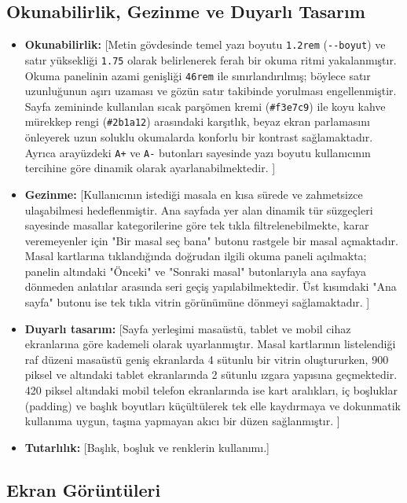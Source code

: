 \documentclass[12pt,a4paper]{article}
\begin{document}
\subsection{Okunabilirlik, Gezinme ve Duyarlı Tasarım}
\begin{itemize}
  \item \textbf{Okunabilirlik:} [Metin gövdesinde temel yazı boyutu \verb|1.2rem| (\verb|--boyut|) ve satır yüksekliği \verb|1.75| olarak belirlenerek ferah bir okuma ritmi yakalanmıştır. Okuma panelinin azami genişliği \verb|46rem| ile sınırlandırılmış; böylece satır uzunluğunun aşırı uzaması ve gözün satır takibinde yorulması engellenmiştir. Sayfa zemininde kullanılan sıcak parşömen kremi (\verb|#f3e7c9|) ile koyu kahve mürekkep rengi (\verb|#2b1a12|) arasındaki karşıtlık, beyaz ekran parlamasını önleyerek uzun soluklu okumalarda konforlu bir kontrast sağlamaktadır. Ayrıca arayüzdeki \verb|A+| ve \verb|A-| butonları sayesinde yazı boyutu kullanıcının tercihine göre dinamik olarak ayarlanabilmektedir.  ]
  \item \textbf{Gezinme:} [Kullanıcının istediği masala en kısa sürede ve zahmetsizce ulaşabilmesi hedeflenmiştir. Ana sayfada yer alan dinamik tür süzgeçleri sayesinde masallar kategorilerine göre tek tıkla filtrelenebilmekte, karar veremeyenler için "Bir masal seç bana" butonu rastgele bir masal açmaktadır. Masal kartlarına tıklandığında doğrudan ilgili okuma paneli açılmakta; panelin altındaki "Önceki" ve "Sonraki masal" butonlarıyla ana sayfaya dönmeden anlatılar arasında seri geçiş yapılabilmektedir. Üst kısımdaki "Ana sayfa" butonu ise tek tıkla vitrin görünümüne dönmeyi sağlamaktadır. ]
  \item \textbf{Duyarlı tasarım:} [Sayfa yerleşimi masaüstü, tablet ve mobil cihaz ekranlarına göre kademeli olarak uyarlanmıştır. Masal kartlarının listelendiği raf düzeni masaüstü geniş ekranlarda 4 sütunlu bir vitrin oluştururken, 900 piksel ve altındaki tablet ekranlarında 2 sütunlu ızgara yapısına geçmektedir. 420 piksel altındaki mobil telefon ekranlarında ise kart aralıkları, iç boşluklar (padding) ve başlık boyutları küçültülerek tek elle kaydırmaya ve dokunmatik kullanıma uygun, taşma yapmayan akıcı bir düzen sağlanmıştır.  ]
  \item \textbf{Tutarlılık:} [Başlık, boşluk ve renklerin kullanımı.]
\end{itemize}

\subsection{Ekran Görüntüleri}
\end{document}
